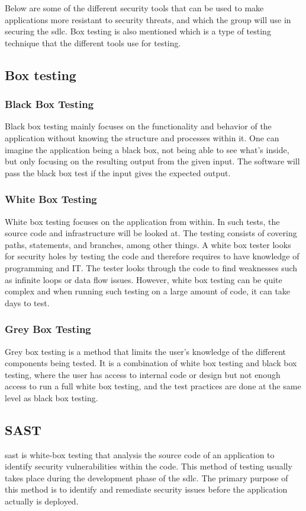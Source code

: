 Below are some of the different security tools that can be used to make applications more resistant to security threats, and which the group will use in securing the \acrshort{sdlc}. Box testing is also mentioned which is a type of testing technique that the different tools use for testing.  
\newpage
\subsection{Box testing}
\label{boxtesting}

\subsubsection{Black Box Testing}
Black box testing mainly focuses on the functionality and behavior of the application without knowing the structure and processes within it. One can imagine the application being a black box, not being able to see what's inside, but only focusing on the resulting output from the given input. The software will pass the black box test if the input gives the expected output. \cite{blackbox}

\subsubsection{White Box Testing}
White box testing focuses on the application from within. In such tests, the source code and infrastructure will be looked at. The testing consists of covering paths, statements, and branches, among other things. A white box tester looks for security holes by testing the code and therefore requires to have knowledge of programming and IT. The tester looks through the code to find weaknesses such as infinite loops or data flow issues. However, white box testing can be quite complex and when running such testing on a large amount of code, it can take days to test.   \cite{whitebox}

\subsubsection{Grey Box Testing}
Grey box testing is a method that limits the user's knowledge of the different components being tested. It is a combination of white box testing and black box testing, where the user has access to internal code or design but not enough access to run a full white box testing, and the test practices are done at the same level as black box testing. \cite{GreyBox}


\subsection{SAST}
\acrlong{sast} is white-box testing that analysis the source code of an application to identify security vulnerabilities within the code. This method of testing usually takes place during the development phase of the \acrlong{sdlc}. The primary purpose of this method is to identify and remediate security issues before the application actually is deployed. \cite{sast}

